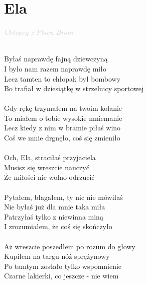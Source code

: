 \documentclass[a5paper, 10pt]{book}
\begin{document}
\newpage
\section{Ela}\textcolor{lightgray}{\textit{Chłopcy z Placu Broni}}\\~\\
\begin{minipage}[t]{0.8\textwidth}
Byłaś naprawdę fajną dziewczyną\\
I było nam razem naprawdę miło\\
Lecz tamten to chłopak był bombowy\\
Bo trafiał w dziesiątkę w strzelnicy sportowej\\
\\
Gdy rękę trzymałem na twoim kolanie\\
To miałem o tobie wysokie mniemanie\\
Lecz kiedy z nim w bramie piłaś wino\\
Coś we mnie drgnęło, coś się zmieniło\\
\\
\hspace*{5mm}Och, Ela, straciłaś przyjaciela\\
\hspace*{5mm}Musisz się wreszcie nauczyć\\
\hspace*{5mm}Że miłości nie wolno odrzucić\\
\\
Pytałem, błagałem, ty nic nie mówiłaś\\
Nie byłaś już dla mnie taka miła\\
Patrzyłaś tylko z niewinna miną\\
I zrozumiałem, że coś się skończyło\\
\\
Aż wreszcie poszedłem po rozum do głowy\\
Kupiłem na targu nóż sprężynowy\\
Po tamtym zostało tylko wspomnienie\\
Czarne lakierki, co jeszcze - nie wiem\\
\end{minipage}
\end{document}
